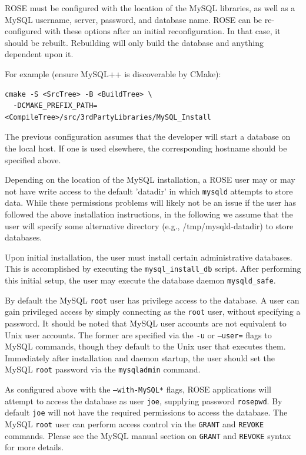 \documentclass[times, 10pt]{book}
\begin{document}
ROSE must be configured with the location of the MySQL libraries, as well
as a MySQL username, server, password, and database name.  ROSE can be 
re-configured with these options after an initial reconfiguration.  In
that case, it should be rebuilt.  Rebuilding will only build the
database and anything dependent upon it.

For example (ensure MySQL++ is discoverable by CMake):

\begin{verbatim}
cmake -S <SrcTree> -B <BuildTree> \
  -DCMAKE_PREFIX_PATH=<CompileTree>/src/3rdPartyLibraries/MySQL_Install
\end{verbatim}

The previous configuration assumes that the developer will start a database
on the local host.  If one is used elsewhere, the corresponding hostname
should be specified above.

Depending on the location of the MySQL installation, a ROSE user may or
may not have write access to the default 'datadir' in which {\tt mysqld}
attempts to store data.  While these permissions problems will likely not
be an issue if the user has followed the above installation instructions,
in the following we assume that the user will specify some alternative
directory (e.g., /tmp/mysqld-datadir) to store databases.

Upon initial installation, the user must install certain administrative
databases.  This is accomplished by executing the {\tt mysql\_install\_db}
script.  After performing this initial setup, the user may
execute the database daemon {\tt mysqld\_safe}.  

By default the MySQL {\tt root} user has privilege access to the database.
A user can gain privileged access by simply connecting as the {\tt root}
user, without specifying a password.  It should be noted that MySQL
user accounts are not equivalent to Unix user accounts.  The former are
specified via the {\tt -u} or {\tt --user=} flags to MySQL commands,
though they default to the Unix user that executes them.  Immediately
after installation and daemon startup, the user should set the MySQL
{\tt root} password via the {\tt mysqladmin} command.  

As configured above with the {\tt --with-MySQL*} flags, ROSE applications
will attempt to access the database as user {\tt joe}, supplying
password {\tt rosepwd}.  By default {\tt joe} will not have the required
permissions to access the database.  The MySQL {\tt root} user can
perform access control via the {\tt GRANT} and {\tt REVOKE} commands.
Please see the MySQL manual section on {\tt GRANT} and {\tt REVOKE} syntax
for more details.
\end{document}
